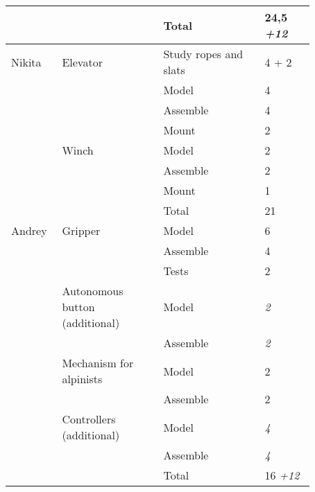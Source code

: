\begin{table}[H]
\begin{center}
\begin{tabular}{|p{0.12\linewidth}|p{0.3\linewidth}|p{0.3\linewidth}|p{0.15\linewidth}|}
			\hline                                
			& & Total	& 24,5 \textit{+12}\\                        
			\hline
			\hline                                            
			Nikita	& Elevator	& Study ropes and slats	& 4 + 2 \\        
			& & Model &	4 \\
			& & Assemble & 4 \\                                  
			& & Mount & 2 \\
			\hline                                     
			& Winch & Model & 2 \\                               
			& & Assemble & 2 \\                                 
			& & Mount & 1 \\                                     
			& & Total & 21 \\                                   
			\hline
			\hline                                            
			Andrey & Gripper & Model & 6 \\                             
			& & Assemble & 4 \\                
			& & Tests & 2 \\                                   
			\hline
			& Autonomous button (additional)	& Model & \textit{2} \\                   
			& & Assemble & \textit{2} \\             
			\hline
			& Mechanism for alpinists & Model & 2 \\             
			& & Assemble & 2 \\                                  
			\hline
			& Controllers (additional) & Model & \textit{4} \\                        
			& & Assemble & \textit{4} \\
			\hline                                  
			& & Total & 16 \textit{+12} \\                              
			
			\hline
		\end{tabular}
	\end{center}
\end{table} 
